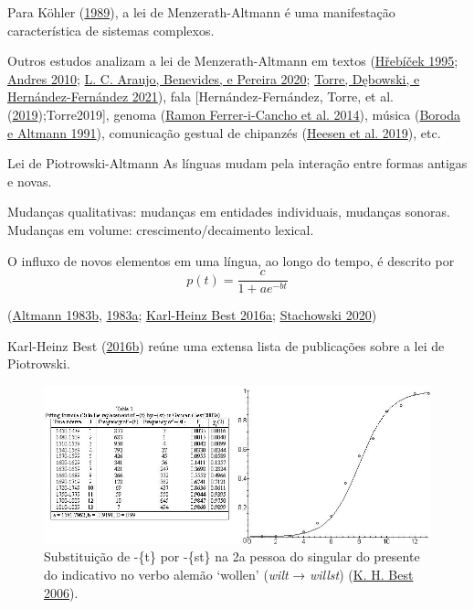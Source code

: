 \documentclass[
  ignorenonframetext,
  aspectratio=169]{beamer}
\begin{document}
\begin{frame}
Para Köhler (\protect\hyperlink{ref-kohler1989menzerathsche}{1989}), a
lei de Menzerath-Altmann é uma manifestação característica de sistemas
complexos.

Outros estudos analizam a lei de Menzerath-Altmann em textos
(\protect\hyperlink{ref-hrebicek1995}{Hřebíček 1995};
\protect\hyperlink{ref-andres2010}{Andres 2010};
\protect\hyperlink{ref-araujo2020}{L. C. Araujo, Benevides, e Pereira
2020}; \protect\hyperlink{ref-gtorre2021}{Torre, Dębowski, e
Hernández-Fernández 2021}), fala {[}Hernández-Fernández, Torre, et al.
(\protect\hyperlink{ref-HernndezFernndez2019}{2019});Torre2019{]},
genoma (\protect\hyperlink{ref-ferrer2014menzerath}{Ramon
Ferrer-i-Cancho et al. 2014}), música
(\protect\hyperlink{ref-boroda1991}{Boroda e Altmann 1991}), comunicação
gestual de chipanzés (\protect\hyperlink{ref-heesen2019}{Heesen et al.
2019}), etc.
\end{frame}

\begin{frame}{Lei de Piotrowski-Altmann}
\protect\hypertarget{lei-de-piotrowski-altmann}{}
As línguas mudam pela interação entre formas antigas e novas.

Mudanças qualitativas: mudanças em entidades individuais, mudanças
sonoras. Mudanças em volume: crescimento/decaimento lexical.

O influxo de novos elementos em uma língua, ao longo do tempo, é
descrito por \[
p(t) = \frac{c}{1 + ae^{-bt}}
\]

(\protect\hyperlink{ref-altmann1983piotrowski}{Altmann 1983b},
\protect\hyperlink{ref-altmann1983law}{1983a};
\protect\hyperlink{ref-best2016bibliography}{Karl-Heinz Best 2016a};
\protect\hyperlink{ref-stachowski2020}{Stachowski 2020})

Karl-Heinz Best (\protect\hyperlink{ref-Best2016}{2016b}) reúne uma
extensa lista de publicações sobre a lei de Piotrowski.
\end{frame}

\begin{frame}
\begin{figure}
\centering
\includegraphics[width=1\textwidth,height=\textheight]{best_german_wollen.png}
\caption{Substituição de -\{t\} por -\{st\} na 2a pessoa do singular do
presente do indicativo no verbo alemão `wollen' (\emph{wilt} →
\emph{willst}) (\protect\hyperlink{ref-best2006quantitative}{K. H. Best
2006}).}
\end{figure}
\end{frame}
\end{document}

